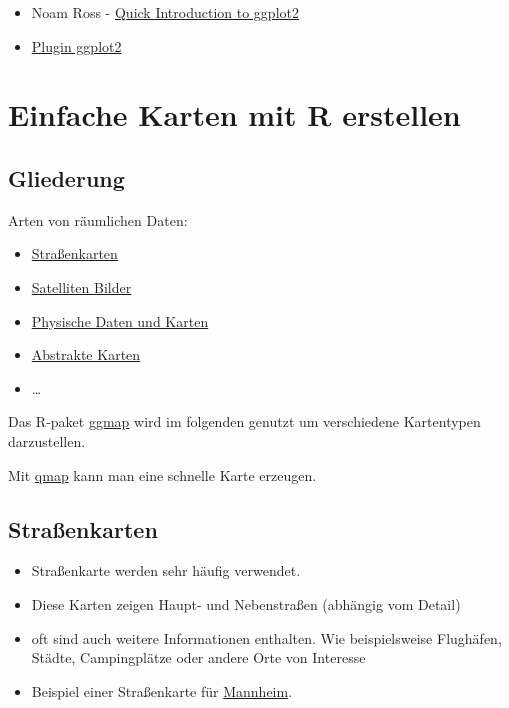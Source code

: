 \documentclass[]{article}
\providecommand{\tightlist}{%
  \setlength{\itemsep}{0pt}\setlength{\parskip}{0pt}}
\begin{document}
\begin{itemize}
\item
  Noam Ross -
  \href{http://www.noamross.net/blog/2012/10/5/ggplot-introduction.html}{Quick
  Introduction to ggplot2}
\item
  \href{https://www.r-bloggers.com/rcmdrplugin-kmggplot2_0-2-4-is-on-cran/}{Plugin
  ggplot2}
\end{itemize}

\section{Einfache Karten mit R
erstellen}\label{einfache-karten-mit-r-erstellen}

\subsection{Gliederung}\label{gliederung}

Arten von räumlichen Daten:

\begin{itemize}
\tightlist
\item
  \href{https://www.nceas.ucsb.edu/~frazier/RSpatialGuides/ggmap/ggmapCheatsheet.pdf}{Straßenkarten}
\item
  \href{http://www.mostlymuppet.com/tag/maps/}{Satelliten Bilder}
\item
  \href{http://gis.stackexchange.com/questions/3083/what-makes-a-map-beautiful/45518\#45518}{Physische
  Daten und Karten}
\item
  \href{http://www.designfaves.com/2014/03/abstracted-maps-reveal-cities-personalities}{Abstrakte
  Karten}
\item
  \ldots{}
\end{itemize}

Das R-paket
\href{http://journal.r-project.org/archive/2013-1/kahle-wickham.pdf}{ggmap}
wird im folgenden genutzt um verschiedene Kartentypen darzustellen.

Mit \href{http://www.inside-r.org/packages/cran/ggmap/docs/qmap}{qmap}
kann man eine schnelle Karte erzeugen.

\subsection{Straßenkarten}\label{straenkarten}

\begin{itemize}
\tightlist
\item
  Straßenkarte werden sehr häufig verwendet.
\item
  Diese Karten zeigen Haupt- und Nebenstraßen (abhängig vom Detail)
\item
  oft sind auch weitere Informationen enthalten. Wie beispielsweise
  Flughäfen, Städte, Campingplätze oder andere Orte von Interesse
\item
  Beispiel einer Straßenkarte für
  \href{http://rpubs.com/Japhilko82/OpenStreetMap_Mannheim}{Mannheim}.
\end{itemize}
\end{document}
